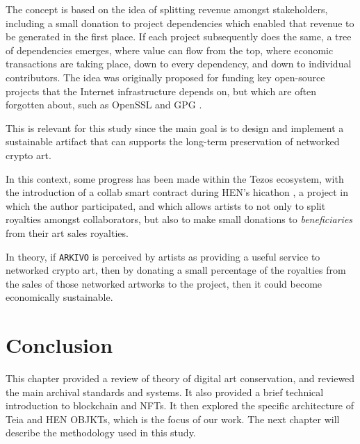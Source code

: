 The concept is based on the idea of splitting revenue amongst stakeholders, including a small donation to project dependencies which enabled that revenue to be generated in the first place. If each project subsequently does the same, a tree of dependencies emerges, where value can flow from the top, where economic transactions are taking place, down to every dependency, and down to individual contributors. The idea was originally proposed for funding key open-source projects that the Internet infrastructure depends on, but which are often forgotten about, such as OpenSSL and GPG \cite{oberhausInternetWasBuilt2019}.

This is relevant for this study since the main goal is to design and implement a sustainable artifact that can supports the long-term preservation of networked crypto art.

In this context, some progress has been made within the Tezos ecosystem, with the introduction of a collab smart contract during HEN's hicathon \cite{HicathonDocsWG2021}, a project in which the author participated, and which allows artists to not only to split royalties amongst collaborators, but also to make small donations to \emph{beneficiaries} from their art sales royalties.

In theory, if \texttt{ARKIVO} is perceived by artists as providing a useful service to networked crypto art, then by donating a small percentage of the royalties from the sales of those networked artworks to the project, then it could become economically sustainable.


\section{Conclusion}

This chapter provided a review of theory of digital art conservation, and reviewed the main archival standards and systems. It also provided a brief technical introduction to blockchain and NFTs. It then explored the specific architecture of Teia and HEN OBJKTs, which is the focus of our work. The next chapter will describe the methodology used in this study.

